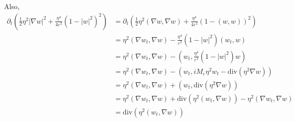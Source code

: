 \documentclass[a4paper]{article}
\renewcommand{\div}{\mathrm{div}}
\begin{document}
Also,
\begin{align} \label{eqn:?}
  \partial_t \left( \frac{1}{2} \eta^2 | \nabla w |^2 + \frac{\eta^4}{4 \varepsilon^2} (1-|w|^2)^2 \right) &= \partial_t \left( \frac{1}{2} \eta^2
  (\nabla w, \nabla w) + \frac{\eta^4}{4 \varepsilon^2} ( 1 - (w,w))^2 \right) \nonumber \\
  &= \eta^2 (\nabla w_t, \nabla w) - \frac{\eta^4}{ \varepsilon^2} (1 - |w|^2) (w_t,w) \nonumber \\
  &= \eta^2 (\nabla w_t, \nabla w) - \left( w_t, \frac{\eta^4}{\varepsilon^2} (1 - |w|^2)w \right) \nonumber \\
  &= \eta^2 (\nabla w_t, \nabla w) - (w_t, i M_\varepsilon \eta^2 w_t - \div(\eta^2 \nabla w) ) \nonumber \\
  &= \eta^2 (\nabla w_t, \nabla w) + (w_t, \div(\eta^2 \nabla w)) \nonumber \\
  &= \eta^2 (\nabla w_t, \nabla w) + \div (\eta^2 (w_t, \nabla w)) - \eta^2 (\nabla w_t, \nabla w) \nonumber \\
  &= \div( \eta^2 ( w_t, \nabla w) )
\end{align}
\end{document}
